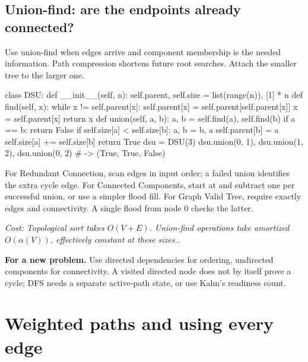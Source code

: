 \documentclass[11pt]{article}
\newcommand{\cd}[1]{{\frenchspacing\texttt{\detokenize{#1}}}}
\newcommand{\transfer}[1]{\par\textbf{For a new problem.} #1\par}
\newcommand{\cost}[1]{\par\textit{Cost: #1.}\par}
\begin{document}
\subsection{Union-find: are the endpoints already connected?}
Use union-find when edges arrive and component membership is the needed information.
Path compression shortens future root searches. Attach the smaller tree to the larger one.
\par\noindent\begin{minipage}{\linewidth}
\hypertarget{example-start-43}{}
\begin{pyex}
class DSU:
    def __init__(self, n):
        self.parent, self.size = list(range(n)), [1] * n
    def find(self, x):
        while x != self.parent[x]:
            self.parent[x] = self.parent[self.parent[x]]
            x = self.parent[x]
        return x
    def union(self, a, b):
        a, b = self.find(a), self.find(b)
        if a == b:
            return False
        if self.size[a] < self.size[b]:
            a, b = b, a
        self.parent[b] = a
        self.size[a] += self.size[b]
        return True
dsu = DSU(3)
dsu.union(0, 1), dsu.union(1, 2), dsu.union(0, 2) # -> (True, True, False)
\end{pyex}
\hypertarget{example-end-43}{}
\end{minipage}\par
For Redundant Connection, scan edges in input order; a failed union identifies the extra cycle edge.
For Connected Components, start at \cd{n} and subtract one per successful union, or use a simpler flood fill.
For Graph Valid Tree, require exactly \cd{n - 1} edges and connectivity. A single flood from node 0 checks the latter.
\cost{Topological sort takes \(O(V+E)\). Union-find operations take amortized \(O(\alpha(V))\), effectively constant at these sizes.}
\transfer{Use directed dependencies for ordering, undirected components for connectivity.
A visited directed node does not by itself prove a cycle; DFS needs a separate active-path state, or use Kahn's readiness count.}

\section{Weighted paths and using every edge}\label{sec:weighted}
\end{document}

